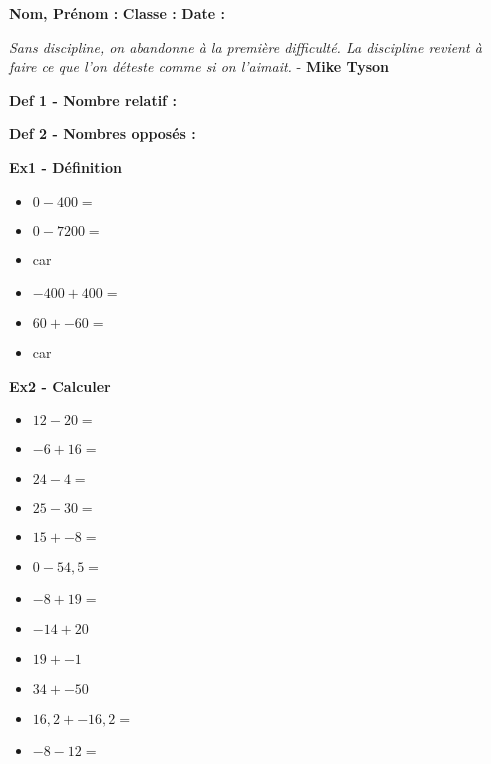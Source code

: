 



\textbf{Nom, Prénom :} \hspace{8cm} \textbf{Classe :} \hspace{3cm} \textbf{Date :}\\

\vspace{-0.3cm}

\begin{center}
  \textit{Sans discipline, on abandonne à la première difficulté. La discipline revient à faire ce que l'on déteste comme si on l'aimait.} - \textbf{Mike Tyson}
\end{center}

\textbf{Def 1 - Nombre relatif :}  \dotfill \\ \Pointilles[1]

\textbf{Def 2 - Nombres opposés :} \dotfill \\ \Pointilles[1]

\textbf{Ex1 - Définition}

\begin{multicols}{2}
  \begin{itemize}[label={$\bullet$}]
    \item $0 - 400 = $  \dotfill
    \item $0 - 7200 = $ \dotfill
    \item car \dotfill \columnbreak
    \item $-400 + 400 = $  \dotfill
    \item $60 + -60 = $ \dotfill
    \item car \dotfill \columnbreak
  \end{itemize} 
  \end{multicols}

\textbf{Ex2 - Calculer}

\begin{multicols}{3}
\begin{itemize}[label={$\bullet$}]
  \item $12 - 20 = $ \dotfill
  \item $-6 + 16 = $ \dotfill
  \item $24 - 4 = $ \dotfill
  \item $25 - 30 = $ \dotfill \columnbreak
  \item $15 + -8 = $ \dotfill
  \item $0 - 54,5 = $ \dotfill
  \item $-8 + 19 = $ \dotfill
  \item $-14 + 20$ \dotfill \columnbreak
  \item $19 + -1$ \dotfill
  \item $34 + -50$ \dotfill
  \item $16,2 + - 16,2 = $ \dotfill
  \item $-8 - 12 = $ \dotfill
\end{itemize} 
\end{multicols}

